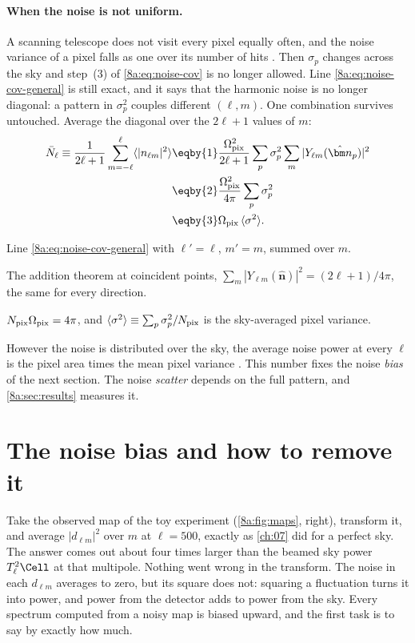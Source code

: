 \paragraph{When the noise is not uniform.}
A scanning telescope does not visit every pixel equally often, and the noise variance of a
pixel falls as one over its number of hits . Then $\sigma_p$ changes
across the sky and step~(3) of \eqref{8a:eq:noise-cov} is no longer allowed. Line
\eqref{8a:eq:noise-cov-general} is still exact, and it says that the harmonic noise is no
longer diagonal: a pattern in $\sigma_p^2$ couples different $(\ell,m)$. One combination
survives untouched. Average the diagonal over the $2\ell+1$ values of $m$:
\begin{align}
  \bar N_\ell\equiv\frac{1}{2\ell+1}\sum_{m=-\ell}^{\ell}\langle|n_{\ell m}|^2\rangle
  &\eqby{1}\frac{\Omega_{\rm pix}^2}{2\ell+1}\sum_p\sigma_p^2\sum_{m}|Y_{\ell m}(\hat{\bm n}_p)|^2 \nonumber\\
  &\eqby{2}\frac{\Omega_{\rm pix}^2}{4\pi}\sum_p\sigma_p^2 \nonumber\\
  &\eqby{3}\Omega_{\rm pix}\,\langle\sigma^2\rangle .
  \label{8a:eq:nbar}
\end{align}
\begin{explain}
  \item Line \eqref{8a:eq:noise-cov-general} with $\ell'=\ell$, $m'=m$, summed over $m$.
  \item The addition theorem at coincident points, $\sum_m|Y_{\ell m}(\hat{\bm n})|^2=(2\ell+1)/4\pi$,
        the same for every direction.
  \item $N_{\rm pix}\Omega_{\rm pix}=4\pi$, and $\langle\sigma^2\rangle\equiv\sum_p\sigma_p^2/N_{\rm pix}$
        is the sky-averaged pixel variance.
\end{explain}
However the noise is distributed over the sky, the average noise power at every $\ell$ is
the pixel area times the mean pixel variance \cite[eq.~48]{Efstathiou2004}. This number fixes
the noise \emph{bias} of the next section. The noise \emph{scatter} depends on the full
pattern, and \cref{8a:sec:results} measures it.
\section{The noise bias and how to remove it}
\label{8a:sec:noise-bias}

Take the observed map of the toy experiment (\cref{8a:fig:maps}, right), transform it, and
average $|d_{\ell m}|^2$ over $m$ at $\ell=500$, exactly as \cref{ch:07} did for a perfect
sky. The answer comes out about four times larger than the beamed sky power $T_\ell^2\Cell$
at that multipole. Nothing went wrong in the transform. The noise in each $d_{\ell m}$
averages to zero, but its square does not: squaring a fluctuation turns it into power, and
power from the detector adds to power from the sky. Every spectrum computed from a noisy map
is biased upward, and the first task is to say by exactly how much.

